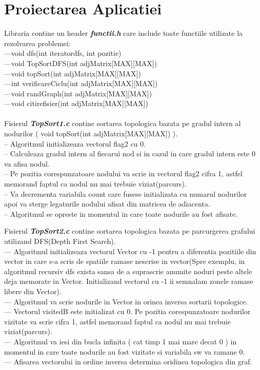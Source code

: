 \documentclass[14pt]{article}
\begin{document}
\section*{Proiectarea Aplicatiei}
\vspace{10 mm}
Libraria contine un header \textbf{\textit{functii.h}} care include toate functiile utilizate la rezolvarea problemei:
\\---void dfs(int iteratordfs, int pozitie)
\\---void TopSortDFS(int adjMatrix[MAX][MAX])
\\---void topSort(int adjMatrix[MAX][MAX])
\\---int verificareCiclu(int adjMatrix[MAX][MAX])
\\---void randGraph(int adjMatrix[MAX][MAX])
\\---void citirefisier(int adjMatrix[MAX][MAX])
\\\vspace{3 mm}
\\Fisierul \textbf{\textit{TopSort1.c}} contine sortarea topologica bazata pe gradul intern al nodurilor ( void topSort(int adjMatrix[MAX][MAX]) ).
\\-- Algoritmul initializeaza vectorul flag2 cu 0.
\\-- Calculeaza gradul intern al fiecarui nod si in cazul in care gradul intern este 0 va afisa nodul.
\\-- Pe pozitia corespunzatoare nodului va scrie in vectorul flag2 cifra 1, astfel memorand faptul ca nodul nu mai trebuie viziat(parcurs).
\\-- Va decrementa variabila count care fusese initializata cu numarul nodurilor apoi va sterge legaturile nodului afisat din matricea de adiacenta.
\\-- Algoritmul se opreste in momentul in care toate nodurile au fost afisate.
\\\vspace{5 mm}

Fisierul \textbf{\textit{TopSort2.c}} contine sortarea topologica bazata pe parcurgerea grafului utilizand DFS(Depth First Search).
\\--- Algoritmul initializeaza vectorul Vector cu -1 pentru a diferentia pozitiile din vector in care s-a scris de spatiile ramase nescrise in vector(Spre exemplu, in algoritmul recursiv dfs exista sansa de a suprascrie anumite noduri peste altele deja memorate in Vector. Initializand vectorul cu -1 ii semnalam zonele ramase libere din Vector).
\\--- Algoritmul va scrie nodurile in Vector in orinea inversa sortarii topologice.
\\--- Vectorul visitedB este initializat cu 0. Pe pozitia corespunzatoare nodurilor vizitate va scrie cifra 1, astfel memorand faptul ca nodul nu mai trebuie viziat(parcurs).
\\--- Algoritmul va iesi din bucla infinita ( cat timp 1 mai mare decat 0 ) in momentul in care toate nodurile au fost vizitate si variabila sw va ramane 0.
\\--- Afisarea vectorului in ordine inversa determina oridinea topologica din graf.
\end{document}
